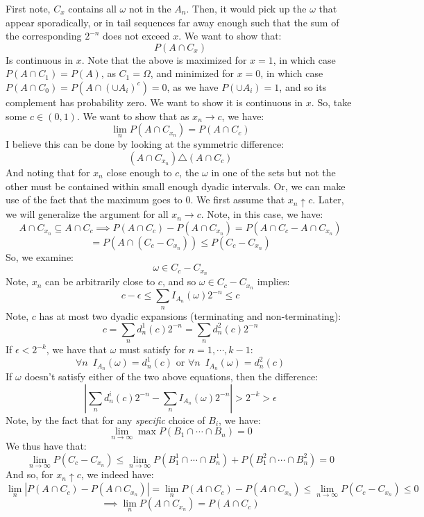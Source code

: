 \documentclass[12pt,a4paper]{article}
\newcommand{\1}[1]{\mathbbm{1}\left\{ #1 \right\}}
\begin{document}
First note, $C_x$ contains all $\omega$ not in the $A_n$. Then, it would pick up the $\omega$ that appear sporadically, or in tail sequences far away enough such that the sum of the corresponding $2^{-n}$ does not exceed $x$. We want to show that:
$$
	P(A \cap C_x)
$$
Is continuous in $x$. Note that the above is maximized for $x = 1$, in which case $P(A \cap C_1) = P(A)$, as $C_1 = \Omega$, and minimized for $x = 0$, in which case $P(A \cap C_0) = P\left(A \cap \left(\cup A_i\right)^c\right) = 0$, as we have $P(\cup A_i) = 1$, and so its complement has probability zero. We want to show it is continuous in $x$. So, take some $c \in (0,1)$. We want to show that as $x_n \to c$, we have:
$$
	\lim_n P(A \cap C_{x_n}) = P(A \cap C_c)
$$
I believe this can be done by looking at the symmetric difference:
$$
	(A \cap C_{x_n}) \triangle (A \cap C_c)
$$
And noting that for $x_n$ close enough to $c$, the $\omega$ in one of the sets but not the other must be contained within small enough dyadic intervals. Or, we can make use of the fact that the maximum goes to $0$. We first assume that $x_n \uparrow c$. Later, we will generalize the argument for all $x_n \to c$. Note, in this case, we have:
$$
	A \cap C_{x_n} \subseteq A \cap C_c \implies
	P(A \cap C_c) - P(A \cap C_{x_n}) = 
	P(A \cap C_c - A \cap C_{x_n})
$$
$$
	= P(A \cap (C_c - C_{x_n})) \leq
	P(C_c - C_{x_n})
$$
So, we examine:
$$
	\omega \in C_c - C_{x_n}
$$
Note, $x_n$ can be arbitrarily close to $c$, and so $\omega \in C_c - C_{x_n}$ implies:
$$
	c - \epsilon \leq \sum_n I_{A_n}(\omega)2^{-n} \leq c
$$
Note, $c$ has at most two dyadic expansions (terminating and non-terminating):
$$
	c = \sum_n d^1_n(c)2^{-n} =
	\sum_n d^2_n(c)2^{-n}
$$
If $\epsilon < 2^{-k}$, we have that $\omega$ must satisfy for $n = 1, \cdots, k-1$:
$$
	\forall n \,\,\, I_{A_n}(\omega) = d^1_n(c) \text{ or } \forall n \,\,\, I_{A_n}(\omega) = d^2_n(c)
$$
If $\omega$ doesn't satisfy either of the two above equations, then the difference:
$$
	\left|\sum_n d^i_n(c)2^{-n} - \sum_n I_{A_n}(\omega)2^{-n}\right| > 2^{-k} > \epsilon
$$
Note, by the fact that for any \textit{specific} choice of $B_i$, we have:
$$
	\lim_{n \to \infty} \max P(B_1 \cap \cdots \cap B_n) = 0
$$
We thus have that:
$$
	\lim_{n \to \infty} P(C_c - C_{x_n}) \leq
	\lim_{n \to \infty} P(B^1_1 \cap \cdots \cap B^1_n) + P(B^2_1 \cap \cdots \cap B^2_n) = 0
$$
And so, for $x_n \uparrow c$, we indeed have:
$$
	\lim_n |P(A \cap C_c) - P(A \cap C_{x_n})| = \lim_n P(A \cap C_c) - P(A \cap C_{x_n}) \leq \lim_{n \to \infty} P(C_c - C_{x_n}) \leq 0
$$
$$
	\implies \lim_n P(A \cap C_{x_n}) = P(A \cap C_c)
$$
\end{document}
